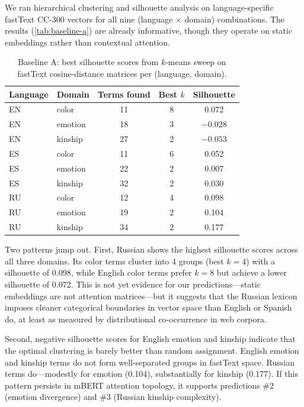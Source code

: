 We ran hierarchical clustering and silhouette analysis on language-specific fastText CC-300 vectors for all nine (language $\times$ domain) combinations. The results (\autoref{tab:baseline-a}) are already informative, though they operate on static embeddings rather than contextual attention.

\begin{table}[ht]
\centering
\begin{tabular}{llccc}
\hline
Language & Domain & Terms found & Best $k$ & Silhouette \\
\hline
EN & color    & 11 & 8 & 0.072 \\
EN & emotion  & 18 & 3 & $-0.028$ \\
EN & kinship  & 27 & 2 & $-0.053$ \\
ES & color    & 11 & 6 & 0.052 \\
ES & emotion  & 22 & 2 & 0.007 \\
ES & kinship  & 32 & 2 & 0.030 \\
RU & color    & 12 & 4 & 0.098 \\
RU & emotion  & 19 & 2 & 0.104 \\
RU & kinship  & 34 & 2 & 0.177 \\
\hline
\end{tabular}
\caption{Baseline A: best silhouette scores from $k$-means sweep on fastText cosine-distance matrices per (language, domain).}
\label{tab:baseline-a}
\end{table}

Two patterns jump out. First, Russian shows the highest silhouette scores across all three domains. Its color terms cluster into 4 groups (best $k = 4$) with a silhouette of 0.098, while English color terms prefer $k = 8$ but achieve a lower silhouette of 0.072. This is not yet evidence for our predictions---static embeddings are not attention matrices---but it suggests that the Russian lexicon imposes cleaner categorical boundaries in vector space than English or Spanish do, at least as measured by distributional co-occurrence in web corpora.

Second, negative silhouette scores for English emotion and kinship indicate that the optimal clustering is barely better than random assignment. English emotion and kinship terms do not form well-separated groups in fastText space. Russian terms do---modestly for emotion (0.104), substantially for kinship (0.177). If this pattern persists in mBERT attention topology, it supports predictions \#2 (emotion divergence) and \#3 (Russian kinship complexity).

